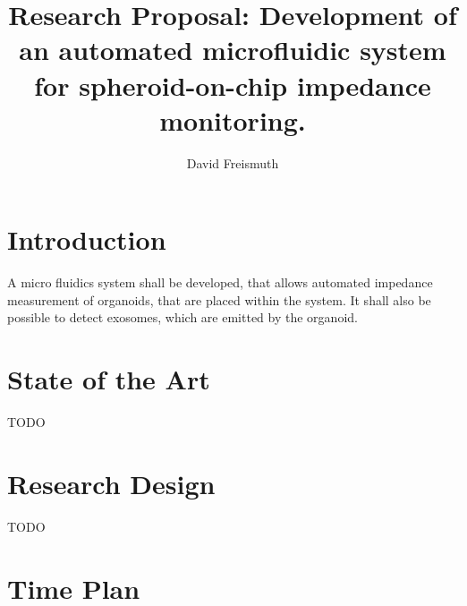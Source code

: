 \documentclass{article}
\newcounter{myWeekNum}
\begin{document}
\setcounter{myWeekNum}{39}
\title{Research Proposal: Development of an automated microfluidic system for spheroid-on-chip impedance monitoring.}
\author{David Freismuth}

\maketitle

 
\section{Introduction}
A micro fluidics system shall be developed, that allows automated impedance measurement of organoids, that are placed within the system. It shall also be possible to detect exosomes, which are emitted by the organoid.

\section{State of the Art}
TODO
\section{Research Design}
TODO
\section{Time Plan}
\end{document}
